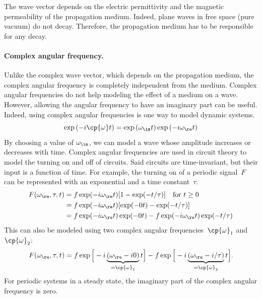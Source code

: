 \begin{refsection}
The wave vector depends on the electric permittivity and the magnetic permeability of the propagation medium.
Indeed, plane waves in free space (pure vacuum) do not decay.
Therefore, the propagation medium has to be responsible for any decay.


\paragraph{Complex angular frequency.}
\label{sec:complex_angular_frequency}

Unlike the complex wave vector, which depends on the propagation medium, the complex angular frequency is completely independent from the medium.
Complex angular frequencies do not help modeling the effect of a medium on a wave.
However, allowing the angular frequency to have an imaginary part can be useful.
Indeed, using complex angular frequencies is one way to model dynamic systems.
\begin{equation}
    \exp \left( -i \cp{\omega} t \right)
    =
    \exp \left(    \omega_\im t \right)
    \exp \left( -i \omega_\re t \right)
\end{equation}
By choosing a value of $\omega_\im$, we can model a wave whose amplitude increases or decreases with time.
Complex angular frequencies are used in circuit theory to model the turning on and off of circuits.
Said circuits are time-invariant, but their input is a function of time.
For example, the turning on of a periodic signal~$F$ can be represented with an exponential and a time constant~$\tau$.
\begin{subequations}
    \begin{align}
        F(\omega_\re, \tau, t)
        &= f \exp(-i \omega_\re t) [1 - \exp(-t/\tau)] \quad \text{for }t \geq 0
        \\
        &= f \exp(-i \omega_\re t) [\exp(-0 t) - \exp(-t/\tau)]
        \\
        &= f \exp(-i \omega_\re t) \exp(-0 t) - f \exp(-i \omega_\re t) \exp(-t/\tau)
    \end{align}
\end{subequations}
This can also be modeled using two complex angular frequencies~$\cp{\omega}_1$ and~$\cp{\omega}_2$:
\begin{equation}
    F(\omega_\re, \tau, t)
    =
    f \exp
    \Big[
        - i
        \underbrace{
            (\omega_\re - i 0)
        }_{=\cp{\omega}_1}
        t
    \Big]
    -
    f \exp
    \Big[
        - i
        \underbrace{
            (\omega_\re - i / \tau)
        }_{=\cp{\omega}_2}
        t
    \Big]
    \text{.}
\end{equation}
For periodic systems in a steady state, the imaginary part of the complex angular frequency is zero.




\end{refsection}
